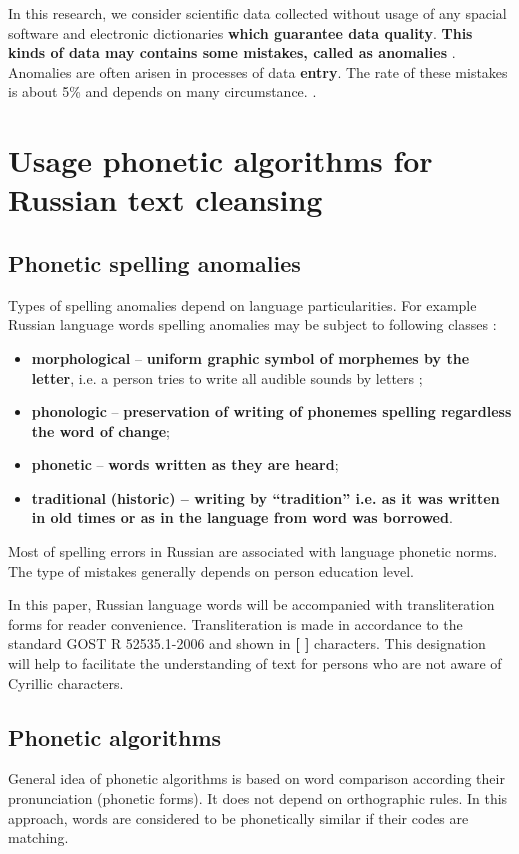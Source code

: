 \documentclass{svproc}
\begin{document}
In this research, we consider scientific data collected without usage of any spacial software and electronic dictionaries\textbf{ which guarantee data quality}. \textbf{This kinds of data may contains some mistakes, called as anomalies} \cite{Orr-1998}. Anomalies are often arisen in processes of data \textbf{entry}. The rate of these mistakes is about 5\% and depends on many circumstance. \cite{Orr-1998}.


\section{Usage phonetic algorithms for Russian text cleansing}
\subsection{Phonetic spelling anomalies}
Types of spelling anomalies depend on language particularities. For example Russian language words spelling anomalies may be subject to following classes \cite{Skripnik-2010}:
\begin{itemize}
\item \textbf{morphological} -- \textbf{uniform graphic symbol of morphemes by the letter}, i.e. a person tries to write all audible sounds by letters \cite{Valgina-2002};
\item \textbf{phonologic} – \textbf{preservation of writing of phonemes spelling regardless the word of change};
\item \textbf{phonetic} – \textbf{words written as they are heard};
\item \textbf{traditional} \textbf{(historic) – writing by “tradition” i.e. as it was written in old times or as in the language from word was borrowed}.
\end{itemize}

Most of spelling errors in Russian are associated with language phonetic norms. The type of mistakes generally depends on person education level\cite{Parubchenko-2005}.

In this paper, Russian language words will be accompanied with transliteration forms for reader convenience. Transliteration is made in accordance to the standard GOST R 52535.1-2006 \cite{GOST-2006} and shown in \textbf{[ ]} characters. This designation will help to facilitate the understanding of text for persons who are not aware of Cyrillic characters.

\subsection{Phonetic algorithms}
General idea of phonetic algorithms is based on word comparison according their pronunciation (phonetic forms). It does not depend on orthographic rules. In this approach, words are considered to be phonetically similar if their codes are matching.
\end{document}
